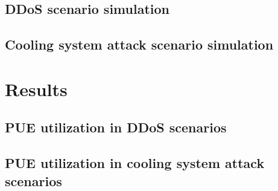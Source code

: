 \subsection{DDoS scenario simulation}

\subsection{Cooling system attack scenario simulation}


\section{Results}

\subsection{PUE utilization in DDoS scenarios}

\subsection{PUE utilization in cooling system attack scenarios}


